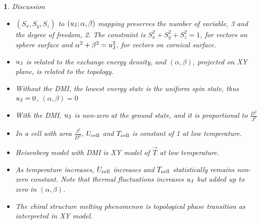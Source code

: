 \documentclass[12pt]{article}
\theoremstyle{problemstyle}
\newtheorem{problem}{}
\begin{document}
\begin{problem} Discussion
    \begin{itemize}
        \item $(S_x, S_y, S_z)$ to $(u_{\rm{J}}; \alpha, \beta)$ mapping preserves the number of variable, 3 and the degree of freedom, 2. The constraint is $S_x^2+S_y^2+S_z^2=1$, for vectors on sphere surface and $\alpha^2 + \beta^2 = u_{\rm{J}}^2$, for vectors on cornical surface.
        \item $u_{\rm{J}}$ is related to the exchange energy density, and $(\alpha, \beta)$, projected on XY plane, is related to the topology.
        \item Without the DMI, the lowest energy state is the uniform spin state, thus $u_{\rm{J}}=0$, $(\alpha, \beta)=0$
        \item With the DMI, $u_{\rm{J}}$ is non-zero at the ground state, and it is proportional to $\frac{D^2}{J^2}$
        \item In a cell with area $\frac{J^2}{D^2}$, $U_{\rm{cell}}$ and $T_{\rm{cell}}$ is constant of 1 at low temperature.
        \item Heisenberg model with DMI is XY model of $\vec{T}$ at low temperature.
        \item As temperature increases, $U_{\rm{cell}}$ increases and $T_{\rm{cell}}$ statistically remains non-zero constant. Note that thermal fluctuations increases $u_{\rm{J}}$ but added up to zero in $(\alpha, \beta)$.
        \item The chiral structure melting phenomenon is topological phase transition as interpreted in XY model.
    \end{itemize}
\end{problem}
\end{document}
